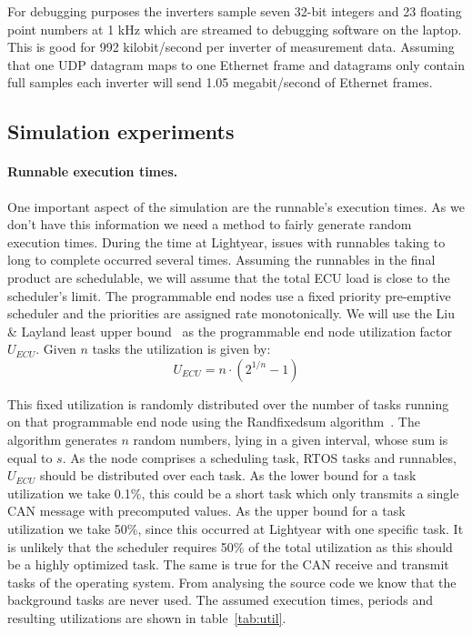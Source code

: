 For debugging purposes the inverters sample seven 32-bit integers and 23 floating point numbers at 1 kHz which are streamed to debugging software on the laptop. This is good for 992 kilobit/second per inverter of measurement data. Assuming that one UDP datagram maps to one Ethernet frame and datagrams only contain full samples each inverter will send 1.05 megabit/second of Ethernet frames. 
\clearpage
\subsection{Simulation experiments}
\paragraph{Runnable execution times.}
One important aspect of the simulation are the runnable's execution times. As we don't have this information we need a method to fairly generate random execution times. During the time at Lightyear, issues with runnables taking to long to complete occurred several times. Assuming the runnables in the final product are schedulable, we will assume that the total ECU load is close to the scheduler's limit. The programmable end nodes use a fixed priority pre-emptive scheduler and the priorities are assigned rate monotonically. We will use the Liu \& Layland least upper bound~\cite{liu1973scheduling} as the programmable end node utilization factor $U_{ECU}$. Given $n$ tasks the utilization is given by:
\begin{equation}
    U_{ECU} = n \cdot (2^{1/n} -1)
\end{equation}

This fixed utilization is randomly distributed over the number of tasks running on that programmable end node using the Randfixedsum algorithm~\cite{emberson2010techniques}. The algorithm generates $n$ random numbers, lying in a given interval, whose sum is equal to $s$. As the node comprises a scheduling task, RTOS tasks and runnables, $U_{ECU}$ should be distributed over each task. As the lower bound for a task utilization we take 0.1\%, this could be a short task which only transmits a single CAN message with precomputed values. As the upper bound for a task utilization we take 50\%, since this occurred at Lightyear with one specific task. It is unlikely that the scheduler requires 50\% of the total utilization as this should be a highly optimized task. The same is true for the CAN receive and transmit tasks of the operating system. From analysing the source code we know that the background tasks are never used. The assumed execution times, periods and resulting utilizations are shown in table~\ref{tab:util}.

